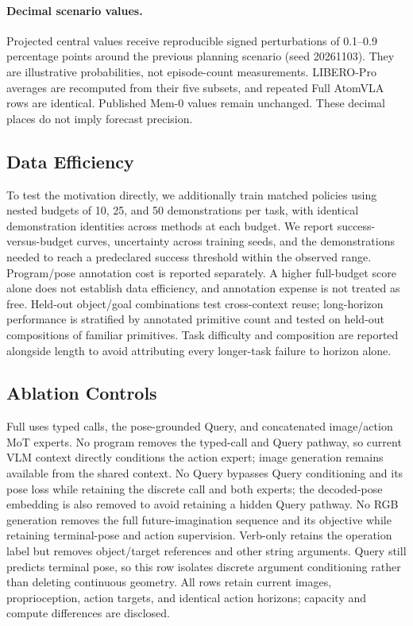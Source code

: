\paragraph{Decimal scenario values.}
Projected central values receive reproducible signed perturbations of 0.1--0.9 percentage points around the previous planning scenario (seed 20261103). They are illustrative probabilities, not episode-count measurements. LIBERO-Pro averages are recomputed from their five subsets, and repeated Full AtomVLA rows are identical. Published Mem-0 values remain unchanged. These decimal places do not imply forecast precision.
\subsection{Data Efficiency}
To test the motivation directly, we additionally train matched policies using nested budgets of 10, 25, and 50 demonstrations per task, with identical demonstration identities across methods at each budget. We report success-versus-budget curves, uncertainty across training seeds, and the demonstrations needed to reach a predeclared success threshold within the observed range. Program/pose annotation cost is reported separately. A higher full-budget score alone does not establish data efficiency, and annotation expense is not treated as free. Held-out object/goal combinations test cross-context reuse; long-horizon performance is stratified by annotated primitive count and tested on held-out compositions of familiar primitives. Task difficulty and composition are reported alongside length to avoid attributing every longer-task failure to horizon alone.
\subsection{Ablation Controls}
\label{app:ablations}
Full \model{} uses typed calls, the pose-grounded Query, and concatenated image/action MoT experts. No program removes the typed-call and Query pathway, so current VLM context directly conditions the action expert; image generation remains available from the shared context. No Query bypasses Query conditioning and its pose loss while retaining the discrete call and both experts; the decoded-pose embedding is also removed to avoid retaining a hidden Query pathway. No RGB generation removes the full future-imagination sequence and its objective while retaining terminal-pose and action supervision. Verb-only retains the operation label but removes object/target references and other string arguments. Query still predicts terminal pose, so this row isolates discrete argument conditioning rather than deleting continuous geometry. All rows retain current images, proprioception, action targets, and identical action horizons; capacity and compute differences are disclosed.

